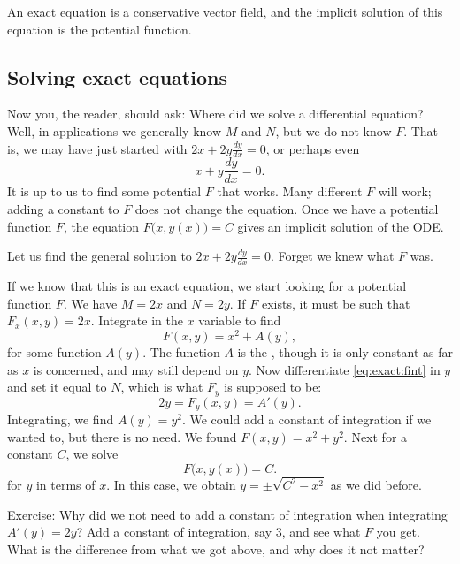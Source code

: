 An exact equation is a conservative vector field, and the implicit
solution of this equation is the potential function.

\subsection{Solving exact equations}

Now you, the reader, should ask: Where did we solve a differential equation?
Well, in applications we generally know $M$ and $N$, but we do not
know $F$.  That is, we may have just started with
$2x + 2y \frac{dy}{dx} = 0$, or perhaps even
\begin{equation*}
x + y \frac{dy}{dx} = 0 .
\end{equation*}
It is up to us to find some potential $F$ that works.  Many different $F$
will work; adding a constant to $F$ does not change the equation.
Once we have a potential function $F$, the equation 
$F\bigl(x,y(x)\bigr) = C$
gives an implicit solution of the ODE\@.

\begin{example}
Let us find the general solution to
$2x + 2y \frac{dy}{dx} = 0$.  Forget we knew
what $F$ was.

If we know that this is an exact equation, we start looking for a potential
function $F$.
We have $M = 2x$ and $N=2y$.
If $F$ exists, it must be such that
$F_x (x,y) = 2x$.
Integrate in the $x$ variable to find
\begin{equation} \label{eq:exact:fint}
F(x,y) = x^2 + A(y) ,
\end{equation}
for some function $A(y)$.  The function $A$ is the , though it is only constant as far as $x$ is concerned, and
may still depend on $y$.  Now differentiate \eqref{eq:exact:fint} in $y$ 
and set it equal to $N$, which is what $F_y$ is supposed to be:
\begin{equation*}
2y = F_y (x,y) = A'(y) .
\end{equation*}
Integrating, we find $A(y) = y^2$.  We could add a constant of integration
if we wanted to, but there is no need.  We found $F(x,y) = x^2+y^2$.
Next for a constant $C$, we solve
\begin{equation*}
F\bigl(x,y(x)\bigr) = C .
\end{equation*}
for $y$ in terms of $x$.  In this case, we obtain $y = \pm \sqrt{C^2-x^2}$
as we did before.
\end{example}

Exercise: Why did we not need to add a constant of integration when integrating $A'(y)
= 2y$?  Add a constant of integration, say $3$, and see what $F$ you get.
What is the difference from what we got above, and why does it not matter?




